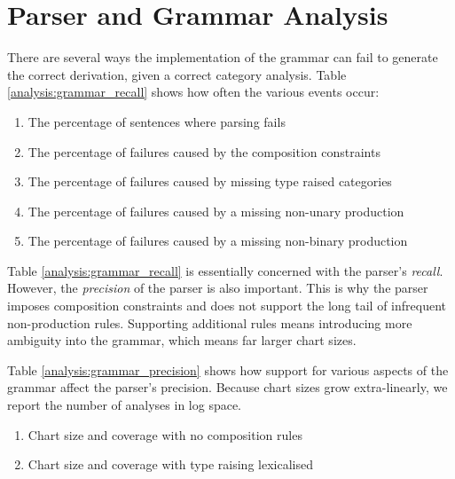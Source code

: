 \begin{figure}
\end{figure}



\section{Parser and Grammar Analysis}

There are several ways the \candc implementation of the \ccgbank grammar can fail to generate the correct derivation, given a correct category analysis. Table \ref{analysis:grammar_recall} shows how often the various events occur:

\begin{enumerate}
 \item The percentage of sentences where parsing fails
 \item The percentage of failures caused by the composition constraints
 \item The percentage of failures caused by missing type raised categories
 \item The percentage of failures caused by a missing non-\ccg unary production
 \item The percentage of failures caused by a missing non-\ccg binary production
\end{enumerate}


Table \ref{analysis:grammar_recall} is essentially concerned with the parser's \emph{recall}. However, the \emph{precision} of the parser is also important. This is why the parser imposes composition constraints and does not support the long tail of infrequent non-\ccg production rules. Supporting additional rules means introducing more ambiguity into the grammar, which means far larger chart sizes.

Table \ref{analysis:grammar_precision} shows how support for various aspects of the \ccgbank grammar affect the parser's precision. Because chart sizes grow extra-linearly, we report the number of analyses in log space.

\begin{enumerate}
 \item Chart size and coverage with no composition rules
 \item Chart size and coverage with type raising lexicalised
\end{enumerate}


